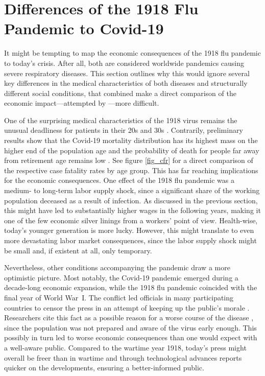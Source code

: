 \documentclass[12pt,a4paper]{article}
\begin{document}
\section{Differences of the 1918 Flu Pandemic to Covid-19} \label{sec_comp}

It might be tempting to map the economic consequences of the 1918 flu pandemic to today's crisis.
After all, both are considered worldwide pandemics causing severe respiratory diseases.
This section outlines why this would ignore several key differences in the medical characteristics of both diseases and structurally different social conditions, that combined make a direct comparison of the economic impact---attempted by \cite{barroCoronavirusGreatInfluenza2020}---more difficult.

One of the surprising medical characteristics of the 1918 virus remains the unusual deadliness for patients in their 20s and 30s \citep{taubenberger1918InfluenzaMother2006}.
Contrarily, preliminary results show that the Covid-19 mortality distribution has its highest mass on the higher end of the population age and the probability of death for people far away from retirement age remains low \citep{weissClinicalCourseMortality2020, zhouClinicalCourseRisk2020}.
See figure \ref{fig_cfr} for a direct comparison of the respective case fatality rates by age group.
This has far reaching implications for the economic consequences.
One effect of the 1918 flu pandemic was a medium- to long-term labor supply shock, since a significant share of the working population deceased as a result of infection.
As discussed in the previous section, this might have led to substantially higher wages in the following years, making it one of the few economic silver linings from a workers' point of view.
Health-wise, today's younger generation is more lucky.
However, this might translate to even more devastating labor market consequences, since the labor supply shock might be small and, if existent at all, only temporary.

Nevertheless, other conditions accompanying the pandemic draw a more optimistic picture.
Most notably, the Covid-19 pandemic emerged during a decade-long economic expansion, while the 1918 flu pandemic coincided with the final year of World War~I.
The conflict led officials in many participating countries to censor the press in an attempt of keeping up the public's morale \citep{chafeeFreedomSpeechWar1919}.
Researchers cite this fact as a possible reason for a worse course of the disease \citep{madhavModelingModernDay2013}, since the population was not prepared and aware of the virus early enough. This possibly in turn led to worse economic consequences than one would expect with a well-aware public.
Compared to the wartime year 1918, today's press might overall be freer than in wartime and through technological advances reports quicker on the developments, ensuring a better-informed public.
\end{document}
